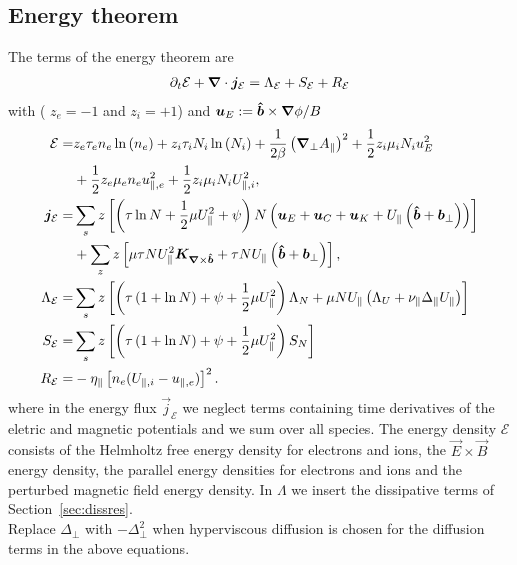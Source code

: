 \subsection{Energy theorem}
The terms of the energy theorem are
\begin{align} \label{eq:energy_theorem}
\partial_t \mathcal E +
{\boldsymbol{\nabla}}\cdot {\boldsymbol{j}}_{\mathcal E}
= \Lambda_{\mathcal E}
+  S_{\mathcal E}
+  R_{\mathcal E}
\end{align}
with ( $z_e=-1$ and $z_i=+1$) and ${\boldsymbol{u}}_E := {\bm{\hat{b}}\times {\boldsymbol{\nabla}}\phi}/{B}$
\begin{align} \label{eq:energy_conservation}
  \mathcal{E}= & z_e\tau_e n_e \ln{(n_e)} +z_i\tau_i N_i\ln{(N_i)}
  +\frac{1}{2\beta}\left({\boldsymbol{\nabla}}_{\perp} A_\parallel\right)^2
   +  \frac{1}{2} z_i \mu_i N_i u_E^2  \nonumber\\
   & +\frac{1}{2} z_e\mu_e  n_e u_{\parallel,e}^2
  +\frac{1}{2} z_i\mu_i  N_i U_{\parallel,i}^2,\\
  {\boldsymbol{j}}_{\mathcal E} =& \sum_s z\left[
  \left(\tau \ln N + \frac{1}{2}\mu U_\parallel^2 + \psi \right)N\left(
  {\boldsymbol{u}}_E + {\boldsymbol{u}}_C + {\boldsymbol{u}}_{K} +U_\parallel\left(\bm{\hat{b}}+{{\boldsymbol{b}}}_\perp\right)  \right) \right]
  \nonumber\\
  &+ \sum_z z\left[\mu \tau NU_\parallel^2{\boldsymbol{K}}_{{\boldsymbol{\nabla}}\times\bm{\hat{b}}} + \tau NU_\parallel \left(\bm{\hat{b}} + {{\boldsymbol{b}}}_\perp\right)\right], \\
  \Lambda_{\mathcal E} =&  \sum_s z\left[\left( \tau\left( 1+\ln{N}\right) + \psi + \frac{1}{2} \mu U_\parallel^2 \right)
  \Lambda_N  +  \mu NU_\parallel\left(\Lambda_U + \nu_\parallel\Delta_\parallel U_\parallel\right) \right]
\nonumber \\
  S_{\mathcal E} =&  \sum_s  z\left[ \left(\tau\left( 1+\ln{N}\right) +\psi + \frac{1}{2} \mu U_\parallel^2 \right)S_{N}\right]
\nonumber \\
  R_{\mathcal E} =&  -\eta_\parallel  \left[ n_e(U_{\parallel,i}-u_{\parallel,e})\right]^2.
\end{align}
where in the energy flux $\vec j_{\mathcal E}$
we neglect terms  containing time derivatives
of the eletric and magnetic potentials and we sum over all species.
The energy density $\mathcal E$ consists of the Helmholtz free energy density for electrons and ions,
the \(\vec{E} \times \vec{B}\) energy density, the parallel energy densities for electrons and ions and the perturbed magnetic field energy density.
In \(\Lambda\) we insert the dissipative terms of Section~\ref{sec:dissres}. \\
Replace $\Delta_\perp$ with $-\Delta_\perp^2$ when hyperviscous diffusion is chosen
for the diffusion terms in the above equations.

